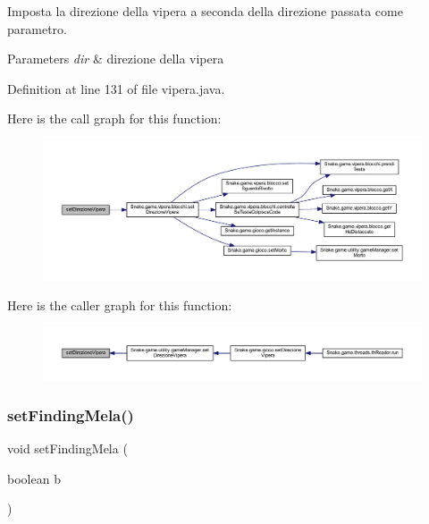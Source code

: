 Imposta la direzione della vipera a seconda della direzione passata come parametro. 


\begin{DoxyParams}{Parameters}
{\em dir} & direzione della vipera \\
\hline
\end{DoxyParams}


Definition at line 131 of file vipera.\+java.

Here is the call graph for this function\+:
\nopagebreak
\begin{figure}[H]
\begin{center}
\leavevmode
\includegraphics[width=350pt]{class_snake_1_1game_1_1vipera_1_1vipera_a6007259ace9d33bd56b9a6193e86df39_cgraph}
\end{center}
\end{figure}
Here is the caller graph for this function\+:
\nopagebreak
\begin{figure}[H]
\begin{center}
\leavevmode
\includegraphics[width=350pt]{class_snake_1_1game_1_1vipera_1_1vipera_a6007259ace9d33bd56b9a6193e86df39_icgraph}
\end{center}
\end{figure}
\mbox{\label{class_snake_1_1game_1_1vipera_1_1vipera_a169584b55e994918baf671fe1c741e39}} 
\subsubsection{\texorpdfstring{set\+Finding\+Mela()}{setFindingMela()}}
{\footnotesize\ttfamily void set\+Finding\+Mela (\begin{DoxyParamCaption}\item[{boolean}]{b }\end{DoxyParamCaption})}




